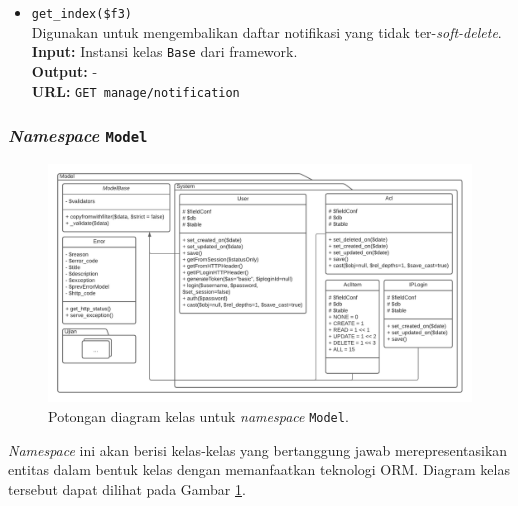 \begin{itemize}
\begin{itemize}
                \item \texttt{get\_index(\$f3)} \\
                    Digunakan untuk mengembalikan daftar notifikasi yang tidak
                    ter-\textit{soft-delete}.\\
                    \textbf{Input:} Instansi kelas \texttt{Base} dari
                    framework.\\
                    \textbf{Output:} -\\
                    \textbf{URL:} \texttt{GET manage/notification}

            \end{itemize}
    \end{itemize}

\subsubsection{\textit{Namespace} \texttt{Model}}
    \begin{figure}
        \centering
        \includegraphics[width=0.8\paperheight]{Gambar/classmap-be/Classmap - app-model.pdf}
        \caption{Potongan diagram kelas untuk \textit{namespace}
        \texttt{Model}.}
        \label{fig:classmap_app-model}
    \end{figure}
    \textit{Namespace} ini akan berisi kelas-kelas yang bertanggung jawab
    merepresentasikan entitas dalam bentuk kelas dengan memanfaatkan teknologi
    ORM. Diagram kelas tersebut dapat dilihat pada Gambar
    \ref{fig:classmap_app-model}.
    
